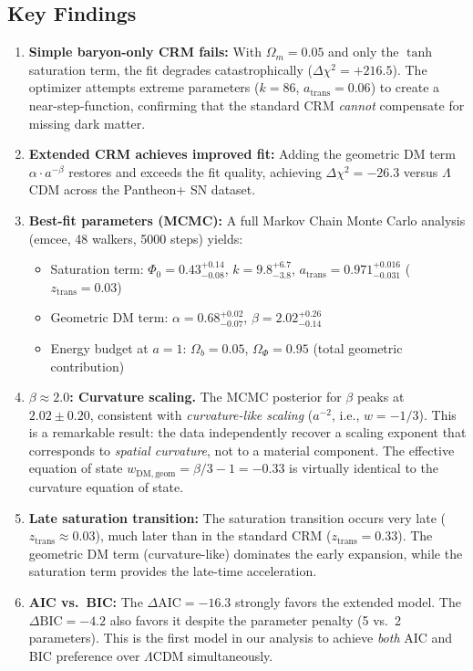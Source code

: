 \documentclass[aps,prd,twocolumn,superscriptaddress,nofootinbib]{revtex4-2}
\begin{document}
\subsection{Key Findings}

\begin{enumerate}
\item \textbf{Simple baryon-only CRM fails:} With $\Omega_m = 0.05$ and only the $\tanh$ saturation term, the fit degrades catastrophically ($\Delta\chi^2 = +216.5$). The optimizer attempts extreme parameters ($k = 86$, $a_{\mathrm{trans}} = 0.06$) to create a near-step-function, confirming that the standard CRM \textit{cannot} compensate for missing dark matter.

\item \textbf{Extended CRM achieves improved fit:} Adding the geometric DM term $\alpha \cdot a^{-\beta}$ restores and exceeds the fit quality, achieving $\Delta\chi^2 = -26.3$ versus $\Lambda$CDM across the Pantheon+ SN dataset.

\item \textbf{Best-fit parameters (MCMC):} A full Markov Chain Monte Carlo analysis (emcee, 48 walkers, 5000 steps) yields:
\begin{itemize}
\item Saturation term: $\Phi_0 = 0.43^{+0.14}_{-0.08}$, $k = 9.8^{+6.7}_{-3.8}$, $a_{\mathrm{trans}} = 0.971^{+0.016}_{-0.031}$ ($z_{\mathrm{trans}} = 0.03$)
\item Geometric DM term: $\alpha = 0.68^{+0.02}_{-0.07}$, $\beta = 2.02^{+0.26}_{-0.14}$
\item Energy budget at $a = 1$: $\Omega_b = 0.05$, $\Omega_\Phi = 0.95$ (total geometric contribution)
\end{itemize}

\item \textbf{$\beta \approx 2.0$: Curvature scaling.} The MCMC posterior for $\beta$ peaks at $2.02 \pm 0.20$, consistent with \textit{curvature-like scaling} ($a^{-2}$, i.e., $w = -1/3$). This is a remarkable result: the data independently recover a scaling exponent that corresponds to \textit{spatial curvature}, not to a material component. The effective equation of state $w_{\mathrm{DM,geom}} = \beta/3 - 1 = -0.33$ is virtually identical to the curvature equation of state.

\item \textbf{Late saturation transition:} The saturation transition occurs very late ($z_{\mathrm{trans}} \approx 0.03$), much later than in the standard CRM ($z_{\mathrm{trans}} = 0.33$). The geometric DM term (curvature-like) dominates the early expansion, while the saturation term provides the late-time acceleration.

\item \textbf{AIC vs.\ BIC:} The $\Delta\mathrm{AIC} = -16.3$ strongly favors the extended model. The $\Delta\mathrm{BIC} = -4.2$ also favors it despite the parameter penalty (5 vs.\ 2 parameters). This is the first model in our analysis to achieve \textit{both} AIC and BIC preference over $\Lambda$CDM simultaneously.
\end{enumerate}
\end{document}
